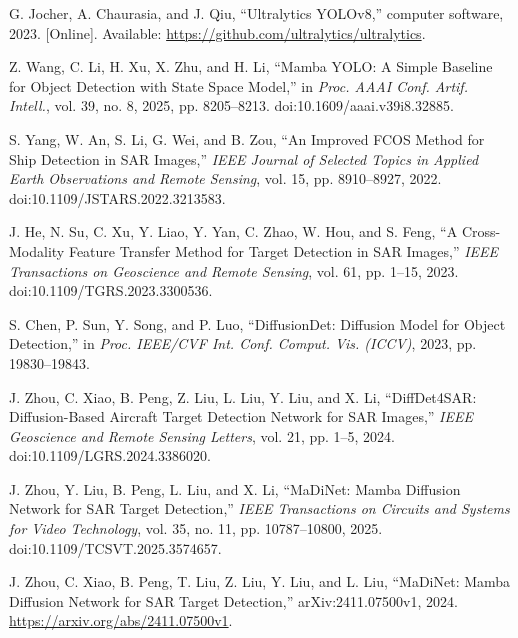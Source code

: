 G. Jocher, A. Chaurasia, and J. Qiu,
``Ultralytics YOLOv8,'' computer software, 2023.
[Online]. Available: \url{https://github.com/ultralytics/ultralytics}.

Z. Wang, C. Li, H. Xu, X. Zhu, and H. Li,
``Mamba YOLO: A Simple Baseline for Object Detection with State Space Model,''
in \emph{Proc. AAAI Conf. Artif. Intell.},
vol. 39, no. 8, 2025, pp. 8205--8213. doi:10.1609/aaai.v39i8.32885.

S. Yang, W. An, S. Li, G. Wei, and B. Zou,
``An Improved FCOS Method for Ship Detection in SAR Images,''
\emph{IEEE Journal of Selected Topics in Applied Earth Observations and Remote Sensing},
vol. 15, pp. 8910--8927, 2022. doi:10.1109/JSTARS.2022.3213583.

J. He, N. Su, C. Xu, Y. Liao, Y. Yan, C. Zhao, W. Hou, and S. Feng,
``A Cross-Modality Feature Transfer Method for Target Detection in SAR Images,''
\emph{IEEE Transactions on Geoscience and Remote Sensing},
vol. 61, pp. 1--15, 2023. doi:10.1109/TGRS.2023.3300536.

S. Chen, P. Sun, Y. Song, and P. Luo,
``DiffusionDet: Diffusion Model for Object Detection,''
in \emph{Proc. IEEE/CVF Int. Conf. Comput. Vis. (ICCV)},
2023, pp. 19830--19843.

J. Zhou, C. Xiao, B. Peng, Z. Liu, L. Liu, Y. Liu, and X. Li,
``DiffDet4SAR: Diffusion-Based Aircraft Target Detection Network for SAR Images,''
\emph{IEEE Geoscience and Remote Sensing Letters},
vol. 21, pp. 1--5, 2024. doi:10.1109/LGRS.2024.3386020.

J. Zhou, Y. Liu, B. Peng, L. Liu, and X. Li,
``MaDiNet: Mamba Diffusion Network for SAR Target Detection,''
\emph{IEEE Transactions on Circuits and Systems for Video Technology},
vol. 35, no. 11, pp. 10787--10800, 2025. doi:10.1109/TCSVT.2025.3574657.

J. Zhou, C. Xiao, B. Peng, T. Liu, Z. Liu, Y. Liu, and L. Liu,
``MaDiNet: Mamba Diffusion Network for SAR Target Detection,''
arXiv:2411.07500v1, 2024. \url{https://arxiv.org/abs/2411.07500v1}.

